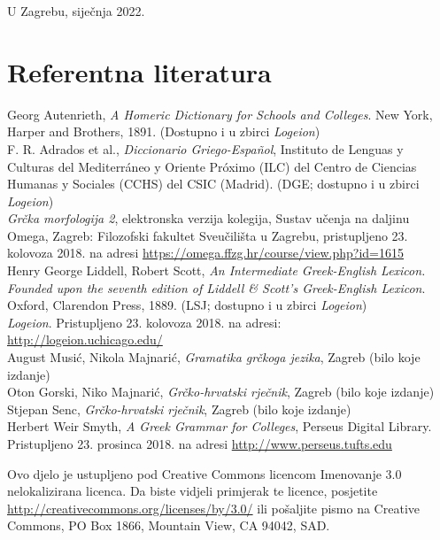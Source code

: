\documentclass[a4paper,12pt,twoside]{report}
\begin{document}

U Zagrebu, siječnja 2022.

\section*{Referentna literatura}

Georg Autenrieth, \textit{A Homeric Dictionary for Schools and Colleges}. New York, Harper and Brothers, 1891. (Dostupno i u zbirci \emph{Logeion})\\
F. R. Adrados et al., \textit{Diccionario Griego-Español}, Instituto de Lenguas y Culturas del Mediterráneo y Oriente Próximo (ILC) del Centro de Ciencias Humanas y Sociales (CCHS) del CSIC (Madrid). (DGE; dostupno i u zbirci \textit{Logeion})\\
\textit{Grčka morfologija 2}, elektronska verzija kolegija, Sustav učenja na daljinu Omega, Zagreb: Filozofski fakultet Sveučilišta u Zagrebu, pristupljeno 23. kolovoza 2018. na adresi \url{https://omega.ffzg.hr/course/view.php?id=1615}\\
Henry George Liddell, Robert Scott, \textit{An Intermediate Greek-English Lexicon. Founded upon the seventh edition of Liddell \& Scott's Greek-English Lexicon}. Oxford, Clarendon Press, 1889. (LSJ; dostupno i u zbirci \textit{Logeion})\\
\textit{Logeion}. Pristupljeno 23. kolovoza 2018. na adresi: \\ \url{http://logeion.uchicago.edu/}\\
August Musić, Nikola Majnarić, \textit{Gramatika grčkoga jezika}, Zagreb (bilo koje izdanje)\\
Oton Gorski, Niko Majnarić, \textit{Grčko-hrvatski rječnik}, Zagreb (bilo koje izdanje)\\
Stjepan Senc, \textit{Grčko-hrvatski rječnik}, Zagreb (bilo koje izdanje)\\
Herbert Weir Smyth, \textit{A Greek Grammar for Colleges}, Perseus Digital Library. Pristupljeno 23. prosinca 2018. na adresi \url{http://www.perseus.tufts.edu}\\

\vspace*{\fill}

\noindent Ovo djelo je ustupljeno pod Creative Commons licencom Imenovanje 3.0 nelokalizirana licenca. Da biste vidjeli primjerak te licence, posjetite \url{http://creativecommons.org/licenses/by/3.0/} ili pošaljite pismo na Creative Commons, PO Box 1866, Mountain View, CA 94042, SAD.
\end{document}
